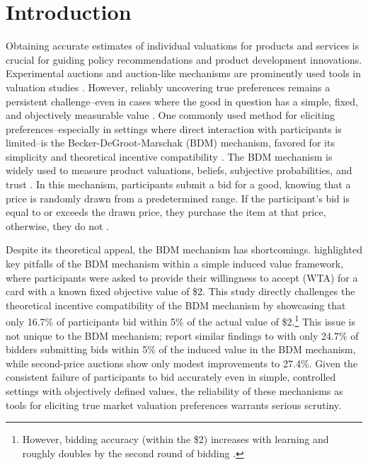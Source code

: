 \documentclass[12pt]{article}
\begin{document}
\onehalfspacing
\section{Introduction}
Obtaining accurate estimates of individual valuations for products and services is crucial for guiding policy recommendations and product development innovations. Experimental auctions and auction-like mechanisms are prominently used tools in valuation studies \citep{lusk2007experimental,canavari2019run}. However, reliably uncovering true preferences remains a persistent challenge--even in cases where the good in question has a simple, fixed, and objectively measurable value \citep{drichoutis2022game, cason_misconceptions_2014}. One commonly used method for eliciting preferences--especially in settings where direct interaction with participants is limited--is the Becker-DeGroot-Marschak (BDM) mechanism,  favored for its simplicity and theoretical incentive compatibility \citep{mamadehussene2023reliability, azrieli2018incentives}. The BDM mechanism is widely used to measure product valuations, beliefs, subjective probabilities, and trust  \citep{mamadehussene2023reliability, ahles_testing_2024, burdea2022online}. In this mechanism, participants submit a bid for a good, knowing that a price is randomly drawn from a predetermined range. If the participant's bid is equal to or exceeds the drawn price, they purchase the item at that price, otherwise, they do not \citep{becker_measuring_1964}.

Despite its theoretical appeal, the BDM mechanism has shortcomings. 
\citet{cason_misconceptions_2014} highlighted key pitfalls of the BDM mechanism within a simple induced value framework, where participants were asked to provide their willingness to accept (WTA) for a card with a known fixed objective value of \$2. This study directly challenges the theoretical incentive compatibility of the BDM mechanism by showcasing that only 16.7\% of participants bid within 5\% of the actual value of \$2.\footnote{However, bidding accuracy (within the \$2) increases with learning and roughly doubles by the second round of bidding \cite{cason_misconceptions_2014}.} This issue is not unique to the BDM mechanism; \citet{DrichoutisEtAl2024incentives} report similar findings to \citet{cason_misconceptions_2014} with only 24.7\% of bidders submitting bids within 5\% of the induced value in the BDM mechanism, while second-price auctions show only modest improvements to 27.4\%. Given the consistent failure of participants to bid accurately even in simple, controlled settings with objectively defined values, the reliability of these mechanisms as tools for eliciting true market valuation preferences warrants serious scrutiny.
\end{document}
